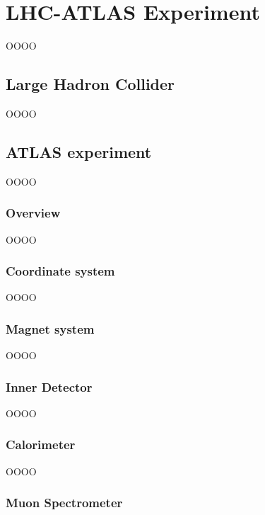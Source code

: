 \chapter{LHC-ATLAS Experiment}
\label{chap:chapter-4}

OOOO

\section{Large Hadron Collider}
\label{heading:Chapters-CH4-2}

OOOO

\section{ATLAS experiment}
\label{heading:Chapters-CH4-3}

OOOO

\subsection{Overview}
\label{heading:Chapters-CH4-4}

OOOO

\subsection{Coordinate system}
\label{heading:Chapters-CH4-5}

OOOO

\subsection{Magnet system}
\label{heading:Chapters-CH4-6}

OOOO

\subsection{Inner Detector}
\label{heading:Chapters-CH4-7}

OOOO

\subsection{Calorimeter}
\label{heading:Chapters-CH4-8}

OOOO

\subsection{Muon Spectrometer}
\label{heading:Chapters-CH4-9}

